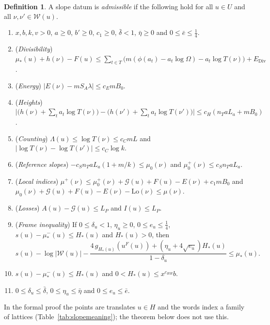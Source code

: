 \documentclass[11pt]{amsart}
\theoremstyle{plain}
\theoremstyle{definition}
\newtheorem{definition}[theorem]{Definition}
\numberwithin{equation}{section}
\begin{document}
\begin{definition}\label{def:slopehyp}
A slope datum is \emph{admissible} if the following hold for all $u\in U$ and all
$\nu,\nu'\in\mathcal W(u)$.
\begin{enumerate}[label=\textup{(S\arabic*)}, start=0, leftmargin=3.2em]
\item\label{S0} $x,b,k,v>0$, $a\ge0$, $b'\ge0$, $c_1\ge0$, $\bar\delta<1$, $\bar\eta\ge0$ and
  $0\le\bar e\le\frac14$.
\item\label{S1} (\emph{Divisibility}) $\mu_\ast(u)+h(\nu)-F(u)\le\sum_{t\in T}\bigl(m(\phi(a_t)-a_t\log\Omega)-a_t\log T(\nu)\bigr)+E_{\mathrm{Div}}$.
\item\label{S2} (\emph{Energy}) $|E(\nu)-mS_A\lambda|\le c_EmB_0$.
\item\label{S3} (\emph{Heights}) $\bigl|\bigl(h(\nu)+\sum_ta_t\log T(\nu)\bigr)-\bigl(h(\nu')+\sum_ta_t\log T(\nu')\bigr)\bigr|\le c_H(n_TaL_a+mB_0)$.
\item\label{S4} (\emph{Counting}) $\Lambda(u)\le\log T(\nu)\le c_CmL$ and $|\log T(\nu)-\log T(\nu')|\le c_C\log k$.
\item\label{S5} (\emph{Reference slopes}) $-c_Sn_TaL_a(1+m/k)\le\mu_0(\nu)$ and $\mu_0^+(\nu)\le c_Sn_TaL_a$.
\item\label{S6} (\emph{Local indices}) $\mu^+(\nu)\le\mu_0^+(\nu)+\mathcal G(u)+F(u)-E(\nu)+c_1mB_0$ and
  $\mu_0(\nu)+\mathcal G(u)+F(u)-E(\nu)-\mathrm{Lo}(\nu)\le\mu(\nu)$.
\item\label{S7} (\emph{Losses}) $A(u)-\mathcal G(u)\le L_P$ and $I(u)\le L_P$.
\item\label{S8} (\emph{Frame inequality}) If $0\le\delta_u<1$, $\eta_u\ge0$, $0\le e_u\le\frac14$,
  $s(u)-\mu_\ast^-(u)\le H_\ast(u)$ and $H_\ast(u)>0$, then
  \[
  s(u)-\log|\mathcal W(u)|-\frac{4\,g_{H_\ast(u)}(u^F(u))+(\eta_u+4\sqrt{e_u})H_\ast(u)}{1-\delta_u}\le\mu_\ast(u).
  \]
\item\label{S9} $s(u)-\mu_\ast^-(u)\le H_\ast(u)$ and $0<H_\ast(u)\le x^{c_{HH}}b$.
\item\label{S10} $0\le\delta_u\le\bar\delta$, $0\le\eta_u\le\bar\eta$ and $0\le e_u\le\bar e$.
\end{enumerate}
\end{definition}

In the formal proof the points are translates $u\in H$ and the words index a family of lattices
(Table~\ref{tab:slopemeaning}); the theorem below does not use this.
\end{document}
